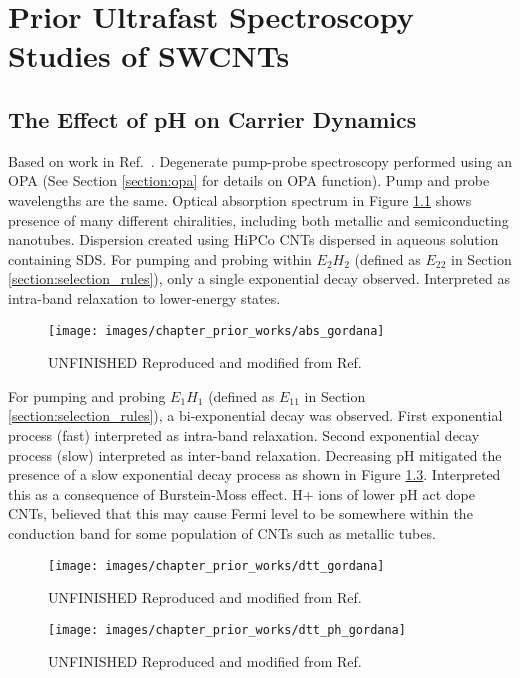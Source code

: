 \chapter{Prior Ultrafast Spectroscopy Studies of SWCNTs}

\section{The Effect of pH on Carrier Dynamics}

Based on work in Ref.\ \cite{ostojic2004interband}. Degenerate pump-probe spectroscopy performed using an OPA (See Section \ref{section:opa} for details on OPA function). Pump and probe wavelengths are the same. Optical absorption spectrum in Figure \ref{fig:abs_gordana} shows presence of many different chiralities, including both metallic and semiconducting nanotubes. Dispersion created using HiPCo CNTs dispersed in aqueous solution containing SDS. For pumping and probing within $E_2 H_2$ (defined as $E_{22}$ in Section \ref{section:selection_rules}), only a single exponential decay observed. Interpreted as intra-band relaxation to lower-energy states.
\begin{figure}[ht]
	\centering
	\texttt{[image: images/chapter\_prior\_works/abs\_gordana]}
	\caption{{\color{red} UNFINISHED } Reproduced and modified from Ref.\ \cite{ostojic2004interband}}
	\label{fig:abs_gordana}
\end{figure}

For pumping and probing $E_1 H_1$ (defined as $E_{11}$ in Section \ref{section:selection_rules}), a bi-exponential decay was observed. First exponential process (fast) interpreted as intra-band relaxation. Second exponential decay process (slow) interpreted as inter-band relaxation. Decreasing pH mitigated the presence of a slow exponential decay process as shown in Figure \ref{fig:dtt_ph_gordana}. Interpreted this as a consequence of Burstein-Moss effect. H+ ions of lower pH act dope CNTs, believed that this may cause Fermi level to be somewhere within the conduction band for some population of CNTs such as metallic tubes.

\begin{figure}[ht]
	\centering
	\texttt{[image: images/chapter\_prior\_works/dtt\_gordana]}
	\caption{{\color{red} UNFINISHED } Reproduced and modified from Ref.\ \cite{ostojic2004interband}}
	\label{fig: abs_gordana}
\end{figure}

\begin{figure}[H]
	\centering
	\texttt{[image: images/chapter\_prior\_works/dtt\_ph\_gordana]}
	\caption{{\color{red} UNFINISHED } Reproduced and modified from Ref.\ \cite{ostojic2004interband}}
	\label{fig:dtt_ph_gordana}
\end{figure}
